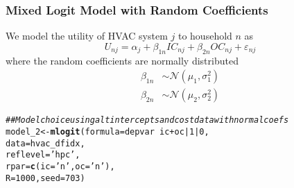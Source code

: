 \documentclass{beamer}\usepackage[]{graphicx}\usepackage[]{color}
\makeatletter
\newcommand{\hlnum}[1]{\textcolor[rgb]{0.686,0.059,0.569}{#1}}%
\newcommand{\hlstr}[1]{\textcolor[rgb]{0.192,0.494,0.8}{#1}}%
\newcommand{\hlcom}[1]{\textcolor[rgb]{0.678,0.584,0.686}{\textit{#1}}}%
\newcommand{\hlopt}[1]{\textcolor[rgb]{0,0,0}{#1}}%
\newcommand{\hlstd}[1]{\textcolor[rgb]{0.345,0.345,0.345}{#1}}%
\newcommand{\hlkwb}[1]{\textcolor[rgb]{0.69,0.353,0.396}{#1}}%
\newcommand{\hlkwc}[1]{\textcolor[rgb]{0.333,0.667,0.333}{#1}}%
\newcommand{\hlkwd}[1]{\textcolor[rgb]{0.737,0.353,0.396}{\textbf{#1}}}%
\newenvironment{kframe}{%
 \def\at@end@of@kframe{}%
 \ifinner\ifhmode%
  \def\at@end@of@kframe{\end{minipage}}%
  \begin{minipage}{\columnwidth}%
 \fi\fi%
 \def\FrameCommand##1{\hskip\@totalleftmargin \hskip-\fboxsep
 \colorbox{shadecolor}{##1}\hskip-\fboxsep
     \hskip-\linewidth \hskip-\@totalleftmargin \hskip\columnwidth}%
 \MakeFramed {\advance\hsize-\width
   \@totalleftmargin\z@ \linewidth\hsize
   \@setminipage}}%
 {\par\unskip\endMakeFramed%
 \at@end@of@kframe}
\newenvironment{knitrout}{}{} %
\makeatother
\begin{document}
\begin{frame}[fragile]\frametitle{Mixed Logit Model with Random Coefficients}
    We model the utility of HVAC system $j$ to household $n$ as
    $$U_{nj} = \alpha_j + \beta_{1n} IC_{nj} + \beta_{2n} OC_{nj} + \varepsilon_{nj}$$
	where the random coefficients are normally distributed
	\begin{align*}
		\beta_{1n} & \sim \mathcal{N}(\mu_1, \sigma_1^2) \\
		\beta_{2n} & \sim \mathcal{N}(\mu_2, \sigma_2^2)
	\end{align*}
\begin{knitrout}\footnotesize
{}\color{fgcolor}\begin{kframe}
\begin{alltt}
\hlcom{## Model choice using alt intercepts and cost data with normal coefs}
\hlstd{model_2} \hlkwb{<-} \hlkwd{mlogit}\hlstd{(}\hlkwc{formula} \hlstd{= depvar} \hlopt{~} \hlstd{ic} \hlopt{+} \hlstd{oc} \hlopt{|} \hlnum{1} \hlopt{|} \hlnum{0}\hlstd{,}
                  \hlkwc{data} \hlstd{= hvac_dfidx,}
                  \hlkwc{reflevel} \hlstd{=} \hlstr{'hpc'}\hlstd{,}
                  \hlkwc{rpar} \hlstd{=} \hlkwd{c}\hlstd{(}\hlkwc{ic} \hlstd{=} \hlstr{'n'}\hlstd{,} \hlkwc{oc} \hlstd{=} \hlstr{'n'}\hlstd{),}
                  \hlkwc{R} \hlstd{=} \hlnum{1000}\hlstd{,} \hlkwc{seed} \hlstd{=} \hlnum{703}\hlstd{)}
\end{alltt}
\end{kframe}
\end{knitrout}
\end{frame}
\end{document}
